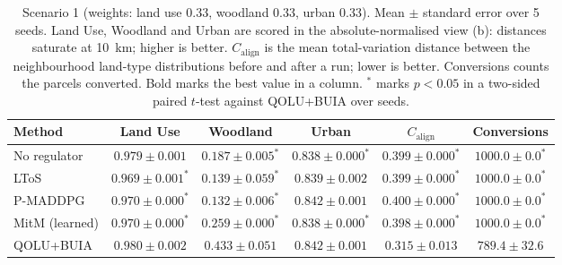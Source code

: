 \begin{table}[htbp]
  \centering
  \caption{Scenario 1 (weights: land use 0.33, woodland 0.33, urban 0.33). Mean $\pm$ standard error over 5 seeds. Land Use, Woodland and Urban are scored in the absolute-normalised view (b): distances saturate at 10~km; higher is better. $C_{\text{align}}$ is the mean total-variation distance between the neighbourhood land-type distributions before and after a run; lower is better. Conversions counts the parcels converted. Bold marks the best value in a column. $^{*}$ marks $p < 0.05$ in a two-sided paired $t$-test against QOLU+BUIA over seeds.}
  \label{tab:p2-results-s1}
  \begin{tabular}{lccccc}
    \toprule
    Method & Land Use & Woodland & Urban & $C_{\text{align}}$ & Conversions \\
    \midrule
    No regulator & $0.979 \pm 0.001$ & $0.187 \pm 0.005^{*}$ & $0.838 \pm 0.000^{*}$ & $0.399 \pm 0.000^{*}$ & $1000.0 \pm 0.0^{*}$ \\
    LToS & $0.969 \pm 0.001^{*}$ & $0.139 \pm 0.059^{*}$ & $0.839 \pm 0.002$ & $0.399 \pm 0.000^{*}$ & $1000.0 \pm 0.0^{*}$ \\
    P-MADDPG & $0.970 \pm 0.000^{*}$ & $0.132 \pm 0.006^{*}$ & $\mathbf{0.842 \pm 0.001}$ & $0.400 \pm 0.000^{*}$ & $1000.0 \pm 0.0^{*}$ \\
    MitM (learned) & $0.970 \pm 0.000^{*}$ & $0.259 \pm 0.000^{*}$ & $0.838 \pm 0.000^{*}$ & $0.398 \pm 0.000^{*}$ & $1000.0 \pm 0.0^{*}$ \\
    QOLU+BUIA & $\mathbf{0.980 \pm 0.002}$ & $\mathbf{0.433 \pm 0.051}$ & $0.842 \pm 0.001$ & $\mathbf{0.315 \pm 0.013}$ & $789.4 \pm 32.6$ \\
    \bottomrule
  \end{tabular}
\end{table}
